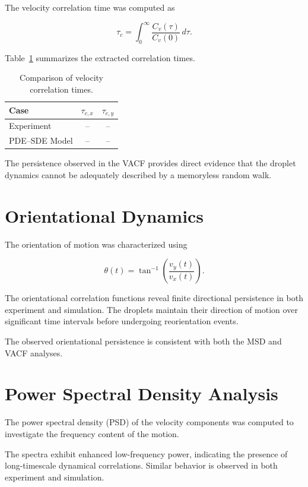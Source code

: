 The velocity correlation time was computed as

\begin{equation}
\tau_c = \int_0^{\infty} \frac{C_v(\tau)}{C_v(0)} \, d\tau.
\end{equation}

Table~\ref{tab:vacfcomparison} summarizes the extracted correlation times.

\begin{table}[h]
\centering
\caption{Comparison of velocity correlation times.}
\label{tab:vacfcomparison}
\begin{tabular}{lcc}
\hline
Case & $\tau_{c,x}$ & $\tau_{c,y}$ \\
\hline
Experiment & -- & -- \\
PDE--SDE Model & -- & -- \\
\hline
\end{tabular}
\end{table}

The persistence observed in the VACF provides direct evidence that the droplet dynamics cannot be adequately described by a memoryless random walk.

\section{Orientational Dynamics}

The orientation of motion was characterized using

\begin{equation}
\theta(t) = \tan^{-1}\left( \frac{v_y(t)}{v_x(t)} \right).
\end{equation}

The orientational correlation functions reveal finite directional persistence in both experiment and simulation. The droplets maintain their direction of motion over significant time intervals before undergoing reorientation events.

The observed orientational persistence is consistent with both the MSD and VACF analyses.

\section{Power Spectral Density Analysis}

The power spectral density (PSD) of the velocity components was computed to investigate the frequency content of the motion.

The spectra exhibit enhanced low-frequency power, indicating the presence of long-timescale dynamical correlations. Similar behavior is observed in both experiment and simulation.

